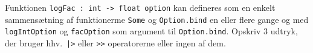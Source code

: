 Funktionen \lstinline{logFac : int -> float option} kan defineres som en enkelt sammensætning af funktionerme \lstinline{Some} og \lstinline{Option.bind} en eller flere gange og med \lstinline{logIntOption} og \lstinline{facOption} som argument til \lstinline{Option.bind}. Opskriv 3 udtryk, der bruger hhv.\ \lstinline{|>} eller \lstinline{>>} operatorerne eller ingen af dem.